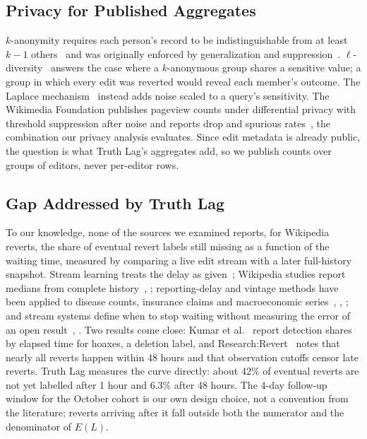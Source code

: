 \subsection{Privacy for Published Aggregates}

$k$-anonymity requires each person's record to be indistinguishable from at least $k-1$ others~\cite{P03_sweeney2002} and was originally enforced by generalization and suppression~\cite{P01_samarati1998}. $\ell$-diversity~\cite{P05a_machanavajjhala2007} answers the case where a $k$-anonymous group shares a sensitive value; a group in which every edit was reverted would reveal each member's outcome. The Laplace mechanism~\cite{P10_dwork2006calibrating} instead adds noise scaled to a query's sensitivity. The Wikimedia Foundation publishes pageview counts under differential privacy with threshold suppression after noise and reports drop and spurious rates~\cite{P17_adeleye2023}, the combination our privacy analysis evaluates. Since edit metadata is already public, the question is what Truth Lag's aggregates add, so we publish counts over groups of editors, never per-editor rows.

\subsection{Gap Addressed by Truth Lag}

To our knowledge, none of the sources we examined reports, for Wikipedia reverts, the share of eventual revert labels still missing as a function of the waiting time, measured by comparing a live edit stream with a later full-history snapshot. Stream learning treats the delay as given~\cite{D02_zliobaite2010}; Wikipedia studies report medians from complete history~\cite{W08_viegas2004}, \cite{W11_geiger2013}; reporting-delay and vintage methods have been applied to disease counts, insurance claims and macroeconomic series~\cite{D18_lawless1994}, \cite{D17_hohle2014}, \cite{D21_aruoba2008}; and stream systems define when to stop waiting without measuring the error of an open result~\cite{S20_akidau2015}, \cite{S26_golab2011}. Two results come close: Kumar et al.~\cite{W12_kumar2016} report detection shares by elapsed time for hoaxes, a deletion label, and Research:Revert~\cite{W05_researchrevert} notes that nearly all reverts happen within 48 hours and that observation cutoffs censor late reverts. Truth Lag measures the curve directly: about 42\% of eventual reverts are not yet labelled after 1 hour and 6.3\% after 48 hours. The 4-day follow-up window for the October cohort is our own design choice, not a convention from the literature; reverts arriving after it fall outside both the numerator and the denominator of $E(L)$.
